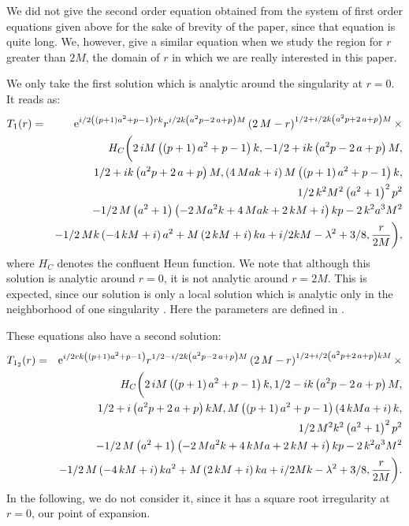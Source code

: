 \documentclass{article}
\begin{document}
We did not give the second order equation obtained from the system
of first order equations given above for the sake of brevity of
the paper, since that equation is quite long. We, however, give
a similar equation when we study the region for $r$ greater than
$2M$, the domain of $r$  in which we are really interested in this paper.

We only take the first solution which is analytic around the
singularity at $r=0$. It reads as:
\begin{eqnarray}
T_1(r) &=& {{\rm e}^{i/2 \left(  \left( p+1 \right) {a}^{2}+p-1 \right) rk}} {r}^{i/2k \left( {a}^{2}p-2\,a+p \right) M
} \left( 2\,M-r \right) ^{1/2+i/2k \left( {a}^{2}p+2\,a+p \right) M} \times \nonumber \\
&&{H_C} \bigg( 2\,iM \left( \left( p+1 \right) {a}^{2}+p-1 \right) k,-1/2+ik \left( {a}^{2}p-2\,a+p \right) M, \nonumber \\
&& 1/2+ik \left( {a}^{2}p+2\,a+p \right) M, \left( 4\,Mak+i \right) M \left(  \left( p+1 \right) {a}^{2}+p-1 \right) k, \\ \nonumber
&& 1/2\,{k}^{2}{M}^{2} \left( {a}^{2}+1 \right) ^{2}{p}^{2} \\
&&-1/2\,M \left( {a}^{2}+1 \right)  \left( -2\,M{a}^{2}k+4\,Mak+2\,kM
+i \right) kp-2\,{k}^{2}{a}^{3}{M}^{2} \nonumber \\
&&-1/2\,Mk \left( -4\,kM+i
 \right) {a}^{2}+M \left( 2\,kM+i \right) ka+i/2kM-{\lambda}^{2}+3/8,
{\frac {r}{2M}} \bigg), \nonumber
\end{eqnarray}
where $H_C$ denotes the confluent Heun function. We note that
although this solution is analytic around $r=0$, it is not
analytic around $r=2M$. This is expected, since our solution is only a  local solution which is analytic only in the neighborhood of one singularity \cite {Ronveaux2}. Here the parameters are defined in \cite{Badawi}.

These equations also have a second solution:
\begin{eqnarray}
T_{1_2}(r) &=& {{\rm e}^{i/2rk \left(  \left( p+1 \right) {a}^{2}+p-1 \right) }}{r}^{
1/2-i/2k \left( {a}^{2}p-2\,a+p \right) M} \left( 2\,M-r \right) ^{1/2
+i/2 \left( {a}^{2}p+2\,a+p \right) kM} \times \\ \nonumber
&&{H_C} \bigg( 2\,iM \left(  \left( p+1 \right) {a}^{2}+p-1 \right) k,1/2-ik \left( {a}^{2}p-2\,a+p \right) M, \\ \nonumber
&& 1/2+i \left( {a}^{2}p+2\,a+p \right) kM, M \left(
 \left( p+1 \right) {a}^{2}+p-1 \right)  \left( 4\,kMa+i \right) k, \\ \nonumber
&& 1/2\,{M}^{2}{k}^{2} \left( {a}^{2}+1 \right) ^{2}{p}^{2} \\ \nonumber
&& -1/2\,M \left( {a
}^{2}+1 \right)  \left( -2\,M{a}^{2}k+4\,kMa+2\,kM+i \right) kp-2\,{k}
^{2}{a}^{3}{M}^{2} \\ \nonumber
&& -1/2\,M \left( -4\,kM+i \right) k{a}^{2}+M \left( 2
\,kM+i \right) ka+i/2Mk-{\lambda}^{2}+3/8,{\frac {r}{2M}}
 \bigg). \nonumber
\end{eqnarray}
In the following, we do not consider it, since it has a square
root irregularity at $r=0 $, our point of expansion.
\end{document}
